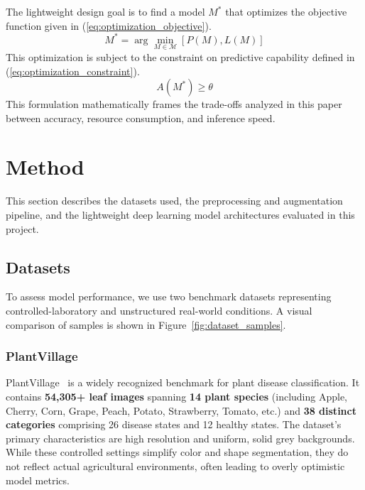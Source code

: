 \documentclass[10pt, conference]{IEEEtran}
\begin{document}
The lightweight design goal is to find a model $M^*$ that optimizes the objective function given in (\ref{eq:optimization_objective}).
\begin{equation}
    \label{eq:optimization_objective}
    M^* = \arg\min_{M \in \mathcal{M}} \left[ P(M), L(M) \right]
\end{equation}
This optimization is subject to the constraint on predictive capability defined in (\ref{eq:optimization_constraint}).
\begin{equation}
    \label{eq:optimization_constraint}
    A(M^*) \ge \theta
\end{equation}
This formulation mathematically frames the trade-offs analyzed in this paper between accuracy, resource consumption, and inference speed.

\section{Method}
\label{sec:method}

This section describes the datasets used, the preprocessing and augmentation pipeline, and the lightweight deep learning model architectures evaluated in this project.

\subsection{Datasets}
\label{subsec:datasets}

To assess model performance, we use two benchmark datasets representing controlled-laboratory and unstructured real-world conditions. A visual comparison of samples is shown in Figure~\ref{fig:dataset_samples}.

\subsubsection{PlantVillage}
PlantVillage~\cite{hughes2015plantvillage} is a widely recognized benchmark for plant disease classification. It contains \textbf{54,305+ leaf images} spanning \textbf{14 plant species} (including Apple, Cherry, Corn, Grape, Peach, Potato, Strawberry, Tomato, etc.) and \textbf{38 distinct categories} comprising 26 disease states and 12 healthy states. The dataset's primary characteristics are high resolution and uniform, solid grey backgrounds. While these controlled settings simplify color and shape segmentation, they do not reflect actual agricultural environments, often leading to overly optimistic model metrics.
\end{document}
